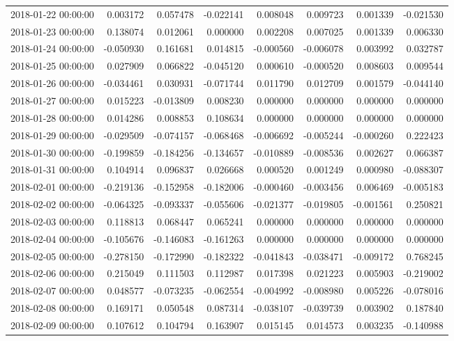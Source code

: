 \begin{tabular}{lrrrrrrr}
2018-01-22 00:00:00 & 0.003172 & 0.057478 & -0.022141 & 0.008048 & 0.009723 & 0.001339 & -0.021530 \\
2018-01-23 00:00:00 & 0.138074 & 0.012061 & 0.000000 & 0.002208 & 0.007025 & 0.001339 & 0.006330 \\
2018-01-24 00:00:00 & -0.050930 & 0.161681 & 0.014815 & -0.000560 & -0.006078 & 0.003992 & 0.032787 \\
2018-01-25 00:00:00 & 0.027909 & 0.066822 & -0.045120 & 0.000610 & -0.000520 & 0.008603 & 0.009544 \\
2018-01-26 00:00:00 & -0.034461 & 0.030931 & -0.071744 & 0.011790 & 0.012709 & 0.001579 & -0.044140 \\
2018-01-27 00:00:00 & 0.015223 & -0.013809 & 0.008230 & 0.000000 & 0.000000 & 0.000000 & 0.000000 \\
2018-01-28 00:00:00 & 0.014286 & 0.008853 & 0.108634 & 0.000000 & 0.000000 & 0.000000 & 0.000000 \\
2018-01-29 00:00:00 & -0.029509 & -0.074157 & -0.068468 & -0.006692 & -0.005244 & -0.000260 & 0.222423 \\
2018-01-30 00:00:00 & -0.199859 & -0.184256 & -0.134657 & -0.010889 & -0.008536 & 0.002627 & 0.066387 \\
2018-01-31 00:00:00 & 0.104914 & 0.096837 & 0.026668 & 0.000520 & 0.001249 & 0.000980 & -0.088307 \\
2018-02-01 00:00:00 & -0.219136 & -0.152958 & -0.182006 & -0.000460 & -0.003456 & 0.006469 & -0.005183 \\
2018-02-02 00:00:00 & -0.064325 & -0.093337 & -0.055606 & -0.021377 & -0.019805 & -0.001561 & 0.250821 \\
2018-02-03 00:00:00 & 0.118813 & 0.068447 & 0.065241 & 0.000000 & 0.000000 & 0.000000 & 0.000000 \\
2018-02-04 00:00:00 & -0.105676 & -0.146083 & -0.161263 & 0.000000 & 0.000000 & 0.000000 & 0.000000 \\
2018-02-05 00:00:00 & -0.278150 & -0.172990 & -0.182322 & -0.041843 & -0.038471 & -0.009172 & 0.768245 \\
2018-02-06 00:00:00 & 0.215049 & 0.111503 & 0.112987 & 0.017398 & 0.021223 & 0.005903 & -0.219002 \\
2018-02-07 00:00:00 & 0.048577 & -0.073235 & -0.062554 & -0.004992 & -0.008980 & 0.005226 & -0.078016 \\
2018-02-08 00:00:00 & 0.169171 & 0.050548 & 0.087314 & -0.038107 & -0.039739 & 0.003902 & 0.187840 \\
2018-02-09 00:00:00 & 0.107612 & 0.104794 & 0.163907 & 0.015145 & 0.014573 & 0.003235 & -0.140988 \\

\end{tabular}
